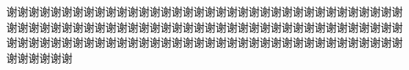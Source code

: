 谢谢谢谢谢谢谢谢谢谢谢谢谢谢谢谢谢谢谢谢谢谢谢谢谢谢谢谢谢谢谢谢谢谢谢谢谢谢谢谢谢谢谢谢谢谢谢谢谢谢谢谢谢谢谢谢谢谢谢谢谢谢谢谢谢谢谢谢谢谢谢谢谢谢谢谢谢谢谢谢谢谢谢谢谢谢谢谢谢谢谢谢谢谢谢谢谢谢谢谢谢谢谢谢谢谢谢谢谢谢谢谢谢谢
